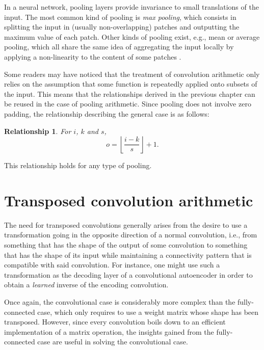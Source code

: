 \documentclass[notitlepage]{report}
\newtheorem{relationship}{Relationship}
\begin{document}
In a neural network, pooling layers provide invariance to small translations of
the input. The most common kind of pooling is \emph{max pooling}, which
consists in splitting the input in (usually non-overlapping) patches and
outputting the maximum value of each patch. Other kinds of pooling exist, e.g.,
mean or average pooling, which all share the same idea of aggregating the input
locally by applying a non-linearity to the content of some patches \citep{%
boureau-cvpr-10,boureau-icml-10,boureau-iccv-11,ICML2011Saxe_551}.

Some readers may have noticed that the treatment of convolution arithmetic only
relies on the assumption that some function is repeatedly applied onto subsets
of the input. This means that the relationships derived in the previous chapter
can be reused in the case of pooling arithmetic. Since pooling does not involve
zero padding, the relationship describing the general case is as follows:

\begin{relationship}\label{rel:pooling}
For $i$, $k$ and $s$,
\begin{equation*}
    o = \left\lfloor \frac{i - k}{s} \right\rfloor + 1.
\end{equation*}
\end{relationship}

\noindent This relationship holds for any type of pooling.

\chapter{Transposed convolution arithmetic}

The need for transposed convolutions generally arises from the desire to use a
transformation going in the opposite direction of a normal convolution, i.e.,
from something that has the shape of the output of some convolution to
something that has the shape of its input while maintaining a connectivity
pattern that is compatible with said convolution. For instance, one might use
such a transformation as the decoding layer of a convolutional autoencoder in
order to obtain a \emph{learned} inverse of the encoding convolution.

Once again, the convolutional case is considerably more complex than the
fully-connected case, which only requires to use a weight matrix whose shape
has been transposed. However, since every convolution boils down to an
efficient implementation of a matrix operation, the insights gained from the
fully-connected case are useful in solving the convolutional case.
\end{document}
